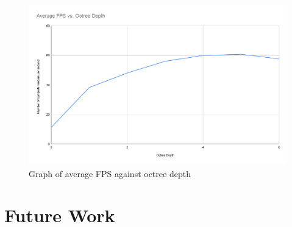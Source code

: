 \documentclass[final]{cmpreport}
\begin{document}
\begin{figure}
    \centering
    \includegraphics[width=\textwidth]{img/Average FPS vs. Octree Depth.png}
    \caption{Graph of average FPS against octree depth}
    \label{graphfpsdda}
\end{figure}

\section{Future Work}
\end{document}
